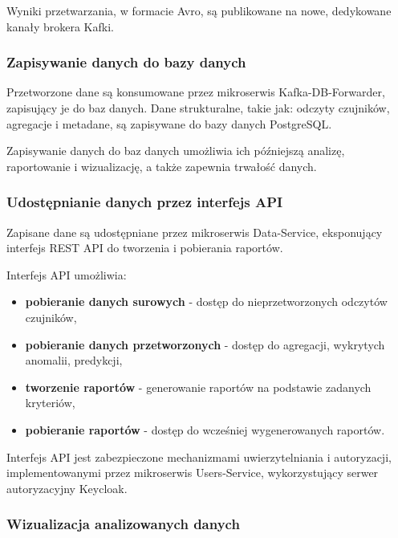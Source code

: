 Wyniki przetwarzania, w formacie Avro, są publikowane na nowe, dedykowane kanały brokera Kafki.

\subsubsection{Zapisywanie danych do bazy danych}
\label{subsubsec:zapisywanie_danych}

Przetworzone dane są konsumowane przez mikroserwis Kafka-DB-Forwarder, zapisujący je do baz danych. Dane strukturalne, takie jak: odczyty czujników,
agregacje i metadane, są zapisywane do bazy danych PostgreSQL.

Zapisywanie danych do baz danych umożliwia ich późniejszą analizę, raportowanie i wizualizację, a także zapewnia trwałość danych.

\subsubsection{Udostępnianie danych przez interfejs API}
\label{subsubsec:udostepnianie_danych}

Zapisane dane są udostępniane przez mikroserwis Data-Service, eksponujący interfejs REST API do tworzenia i pobierania raportów. 

\vspace{0.3em}

Interfejs API umożliwia:

\begin{itemize}
    \item \textbf{pobieranie danych surowych} - dostęp do nieprzetworzonych odczytów czujników,
    \item \textbf{pobieranie danych przetworzonych} - dostęp do agregacji, wykrytych anomalii, predykcji,
    \item \textbf{tworzenie raportów} - generowanie raportów na podstawie zadanych kryteriów,
    \item \textbf{pobieranie raportów} - dostęp do wcześniej wygenerowanych raportów.
\end{itemize}

Interfejs API jest zabezpieczone mechanizmami uwierzytelniania i autoryzacji, implementowanymi przez mikroserwis Users-Service, wykorzystujący serwer autoryzacyjny Keycloak.

\subsubsection{Wizualizacja analizowanych danych}
\label{subsubsec:wizualizacja_danych}

